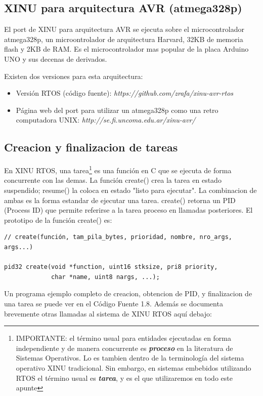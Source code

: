 \documentclass[output=paper, 
colorlinks,
citecolor=brown,
newtxmath
]{langscibook}
\begin{document}
\subsection{XINU para arquitectura AVR (atmega328p)}

El port de XINU para arquitectura AVR se ejecuta sobre el 
microcontrolador atmega328p, un microontrolador de arquitectura Harvard, 
32KB de memoria flash y 2KB de RAM. Es el microcontrolador mas popular 
de la placa Arduino UNO y sus decenas de derivados.

Existen dos versiones para esta arquitectura:
\begin{itemize}
	\item Versión RTOS (código fuente):  \textit{https://github.com/zrafa/xinu-avr-rtos}

	\item Página web del port para utilizar un atmega328p como 
	una retro computadora UNIX: \textit{http://se.fi.uncoma.edu.ar/xinu-avr/}
\end{itemize}

\subsection{ Creacion y finalizacion de tareas}
En XINU RTOS, una tarea\footnote{IMPORTANTE: el término usual para entidades ejecutadas en forma independiente y de manera concurrente es \textbf{\textit{proceso}} en la literatura de Sistemas Operativos. Lo es tambien dentro de la terminología del sistema operativo XINU tradicional. Sin embargo, en sistemas embebidos utilizando RTOS el término usual es \textbf{\textit{tarea}}, y es el que utilizaremos en todo este apunte} es una función en C que se ejecuta de forma concurrente con las demas. La función create() crea la tarea en estado suspendido; resume() la coloca en estado "listo para ejecutar". La combinacion de ambas es la forma estandar de ejecutar una tarea. create() retorna un PID (Process ID) que permite referirse a la tarea proceso en llamadas posteriores.
El prototipo de la función create() es:

\begin{verbatim}
// create(función, tam_pila_bytes, prioridad, nombre, nro_args, args...)

pid32 create(void *function, uint16 stksize, pri8 priority,
             char *name, uint8 nargs, ...);
\end{verbatim}

Un programa ejemplo completo de creacion, obtencion de PID, y finalizacion de una tarea se puede ver en el Código Fuente 1.8. Además se documenta brevemente otras llamadas al sistema de XINU RTOS aquí debajo:
\end{document}
